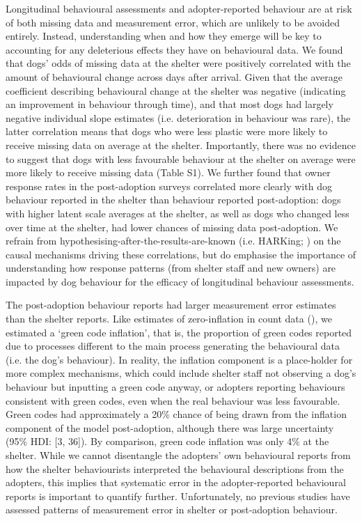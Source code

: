\documentclass[12pt]{article}
\begin{document}
Longitudinal behavioural assessments and adopter-reported behaviour are at risk of both missing data and measurement error, which are unlikely to be avoided entirely. Instead, understanding when and how they emerge will be key to accounting for any deleterious effects they have on behavioural data. We found that dogs' odds of missing data at the shelter were positively correlated with the amount of behavioural change across days after arrival. Given that the average coefficient describing behavioural change at the shelter was negative (indicating an improvement in behaviour through time), and that most dogs had largely negative individual slope estimates (i.e. deterioration in behaviour was rare), the latter correlation means that dogs who were less plastic were more likely to receive missing data on average at the shelter. Importantly, there was no evidence to suggest that dogs with less favourable behaviour at the shelter on average were more likely to receive missing data (Table S1). We further found that owner response rates in the post-adoption surveys correlated more clearly with dog behaviour reported in the shelter than behaviour reported post-adoption: dogs with higher latent scale averages at the shelter, as well as dogs who changed less over time at the shelter, had lower chances of missing data post-adoption. We refrain from hypothesising-after-the-results-are-known (i.e. HARKing; \cite{kerr1998}) on the causal mechanisms driving these correlations, but do emphasise the importance of understanding how response patterns (from shelter staff and new owners) are impacted by dog behaviour for the efficacy of longitudinal behaviour assessments.

The post-adoption behaviour reports had larger measurement error estimates than the shelter reports. Like estimates of zero-inflation in count data (\cite{lambert1992}), we estimated a `green code inflation', that is, the proportion of green codes reported due to processes different to the main process generating the behavioural data (i.e. the dog's behaviour). In reality, the inflation component is a place-holder for more complex mechanisms, which could include shelter staff not observing a dog's behaviour but inputting a green code anyway, or adopters reporting behaviours consistent with green codes, even when the real behaviour was less favourable. Green codes had approximately a 20\% chance of being drawn from the inflation component of the model post-adoption, although there was large uncertainty (95\% HDI: [3, 36]). By comparison, green code inflation was only 4\% at the shelter. While we cannot disentangle the adopters' own behavioural reports from how the shelter behaviourists interpreted the behavioural descriptions from the adopters, this implies that systematic error in the adopter-reported behavioural reports is important to quantify further. Unfortunately, no previous studies have assessed patterns of measurement error in shelter or post-adoption behaviour.
\end{document}
